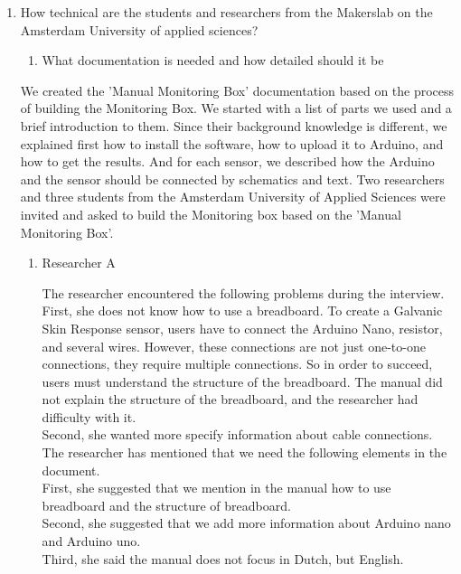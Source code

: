 \documentclass[conference]{IEEEtran}
\begin{document}
\begin{enumerate}
\item How technical are the students and researchers from the Makerslab on the Amsterdam University of applied sciences?
\begin{enumerate}
\item What documentation is needed and how detailed should it be
\end{enumerate}

 We created the 'Manual Monitoring Box' documentation based on the process of building the Monitoring Box. We started with a list of parts we used and a brief introduction to them. Since their background knowledge is different, we explained first how to install the software, how to upload it to Arduino, and how to get the results. And for each sensor, we described how the Arduino and the sensor should be connected by schematics and text. Two researchers and three students from the Amsterdam University of Applied Sciences were invited and asked to build the Monitoring box based on the 'Manual Monitoring Box'. \\
\begin{enumerate}
\item Researcher A

The researcher encountered the following problems during the interview.\\

		First, she does not know how to use a breadboard. To create a Galvanic Skin Response sensor, users have to connect the Arduino Nano, resistor, and several wires. However, these connections are not just one-to-one connections, they require multiple connections. So in order to succeed, users must understand the structure of the breadboard. The manual did not explain the structure of the breadboard, and the researcher had difficulty with it.\\
		Second, she wanted more specify information about cable connections.\\
		 		
The researcher has mentioned that we need the following elements in the document.\\

		First, she suggested that we mention in the manual how to use breadboard and the structure of breadboard. \\
		Second, she suggested that we add more information about Arduino nano and Arduino uno.\\
		Third, she said the manual does not focus in Dutch, but English. \\
		

\end{enumerate}
\end{enumerate}
\end{document}
